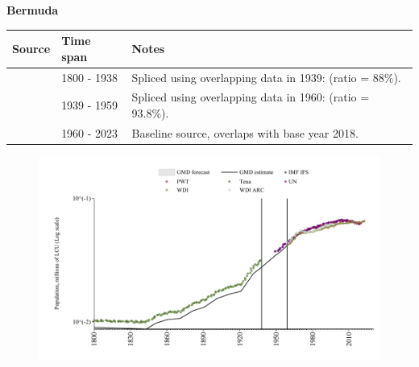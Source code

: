 \documentclass[12pt,a4paper,landscape]{article}
\begin{document}
\begin{adjustbox}{max totalsize={\paperwidth}{\paperheight},center}
\begin{minipage}[t][\textheight][t]{\textwidth}
\vspace*{0.5cm}
{}
\begin{center}
{\Large\bfseries Bermuda}
\end{center}
\vspace{0.5cm}
\begin{table}[H]
\centering
\small
\begin{tabular}{|l|l|l|}
\hline
\textbf{Source} & \textbf{Time span} & \textbf{Notes} \\
\hline
\rowcolor{white}\cite{Tena}& 1800 - 1938 &Spliced using overlapping data in 1939: (ratio = 88\%).\\
\rowcolor{lightgray}\cite{IMF_IFS}& 1939 - 1959 &Spliced using overlapping data in 1960: (ratio = 93.8\%).\\
\rowcolor{white}\cite{WDI}& 1960 - 2023 &Baseline source, overlaps with base year 2018.\\
\hline
\end{tabular}
\end{table}
\begin{figure}[H]
\centering
\includegraphics[width=\textwidth,height=0.6\textheight,keepaspectratio]{graphs/BMU_pop.pdf}
\end{figure}
\end{minipage}
\end{adjustbox}
\end{document}
